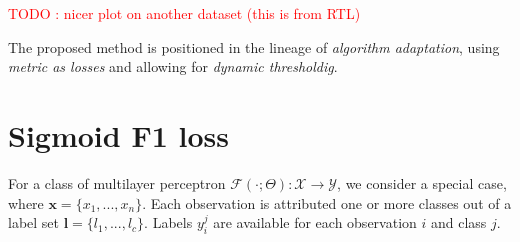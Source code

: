 \documentclass[sigconf,natbib,screen=true,review=true,anonymous]{acmart}
\newcommand\todo[1]{\textcolor{red}{TODO : #1}}
\begin{document}
\todo{nicer plot on another dataset (this is from RTL)}

The proposed method is positioned in the lineage of \emph{algorithm adaptation}, using \emph{metric as losses} and allowing for \emph{dynamic thresholdig}. 



















\section{Sigmoid F1 loss}
\label{sec:org8d334c6}

For a class of multilayer perceptron \(\mathcal{F}(\cdot ; \Theta): \mathcal{X} \rightarrow \mathcal{Y}\), we consider a special case, where \(\mathbf{x} = \{x_1, ..., x_n\}\). Each observation is attributed one or more classes out of a label set \(\mathbf{l} = \{l_1, ..., l_c\}\). Labels \(y_{i}^{j}\) are available for each observation \(i\) and class \(j\). 
\end{document}
